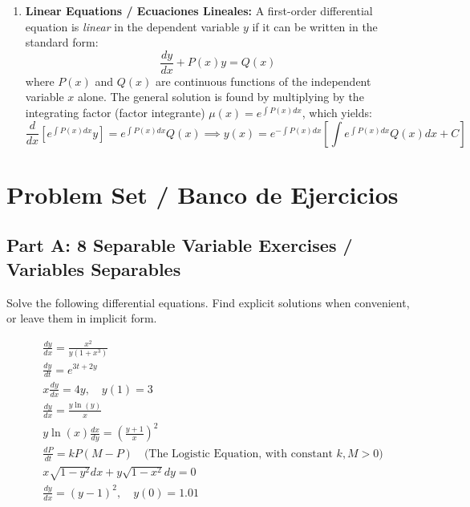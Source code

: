 \documentclass[11pt,letterpaper]{article}
\begin{document}
\begin{enumerate}
    \item \textbf{Linear Equations / Ecuaciones Lineales:}
    A first-order differential equation is \textit{linear} in the dependent variable $y$ if it can be written in the standard form:
    \begin{equation}
        \frac{dy}{dx} + P(x)y = Q(x)
    \end{equation}
    where $P(x)$ and $Q(x)$ are continuous functions of the independent variable $x$ alone. 
    The general solution is found by multiplying by the integrating factor (factor integrante) $\mu(x) = e^{\int P(x)dx}$, which yields:
    \begin{equation}
        \frac{d}{dx}\left[ e^{\int P(x)dx} y \right] = e^{\int P(x)dx} Q(x) \implies y(x) = e^{-\int P(x)dx} \left[ \int e^{\int P(x)dx} Q(x) dx + C \right]
    \end{equation}
\end{enumerate}

\newpage
\section{Problem Set / Banco de Ejercicios}

\subsection*{Part A: 8 Separable Variable Exercises / Variables Separables}
Solve the following differential equations. Find explicit solutions when convenient, or leave them in implicit form.

\begin{align}
    & \frac{dy}{dx} = \frac{x^2}{y(1+x^3)} \label{eq:sep1} \\
    & \frac{dy}{dt} = e^{3t+2y} \label{eq:sep2} \\
    & x \frac{dy}{dx} = 4y, \quad y(1) = 3 \label{eq:sep3} \\
    & \frac{dy}{dx} = \frac{y\ln(y)}{x} \label{eq:sep4} \\
    & y \ln(x) \frac{dx}{dy} = \left(\frac{y+1}{x}\right)^2 \label{eq:sep5} \\
    & \frac{dP}{dt} = k P(M - P) \quad \text{(The Logistic Equation, with constant $k, M > 0$)} \label{eq:sep6} \\
    & x \sqrt{1-y^2} dx + y \sqrt{1-x^2} dy = 0 \label{eq:sep7} \\
    & \frac{dy}{dx} = (y-1)^2, \quad y(0) = 1.01 \label{eq:sep8}
\end{align}
\end{document}
